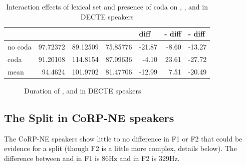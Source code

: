 \documentclass[../../00.FullDoc/tex/Thesis]{subfiles}
\begin{document}

\begin{table}[htbp]
	\centering

	\begin{tabular}{lrrrrrr}
		\hline
		& \multicolumn{1}{l}{\bath{}} & \multicolumn{1}{l}{\palm{}} & \multicolumn{1}{l}{\trap{}} & \multicolumn{1}{l}{\TB{} diff} & \multicolumn{1}{l}{\palm{}-\bath{} diff} & \multicolumn{1}{l}{\trap{}-\palm{} diff} \\
		\hline
		no coda & 97.72372 & 89.12509 & 75.85776 & -21.87 & -8.60 & -13.27 \\
		coda & 91.20108 & 114.8154 & 87.09636 & -4.10 & 23.61 & -27.72 \\
		\hline
		mean  & 94.4624 & 101.9702 & 81.47706 & -12.99 & 7.51  & -20.49 \\
		\hline
	\end{tabular}%
		\caption{Interaction effects of lexical set and presence of coda on \trap{}, \bath{}, and \palm{} in DECTE speakers} \label{tbl:TBPdurDE-inter}%
\end{table}%


\begin{figure}[h]
	
	\caption{Duration of \trap{}, \bath{} and \palm{} in DECTE speakers} \label{fig:TBdurDE}
\end{figure}

\subsection{The Split in CoRP-NE speakers}
The CoRP-NE speakers show little to no difference in F1 or F2 that could be evidence for a \TB{} split (though F2 is a little more complex, details below). The difference between \trap{} and \palm{} in F1 is 86Hz and in F2 is 329Hz.
\end{document}
